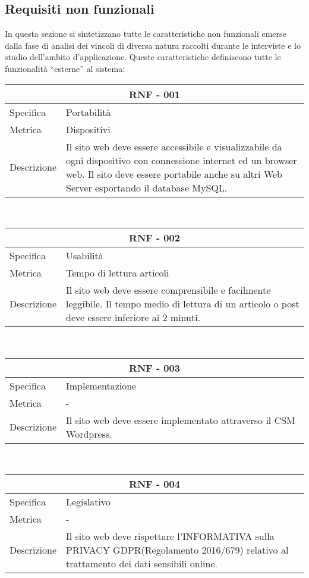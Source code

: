 \documentclass{article}
\begin{document}
\subsection{\textbf{Requisiti non funzionali}}
In questa sezione si sintetizzano tutte le caratteristiche non funzionali emerse dalla fase di  analisi dei vincoli di diversa natura raccolti durante le interviste e lo studio dell'ambito d'applicazione. Queste caratteristiche definiscono tutte le funzionalità “esterne” al sistema:
\vspace{4mm} \vspace{4mm} 
\begin{tabular}{ |p{3cm}|p{8cm}|  }
	\hline
	\multicolumn{2}{|c|}{\textbf{RNF - 001}} \\
	\hline
	Specifica&Portabilità\\
	\hline
	Metrica & Dispositivi\\
	\hline
	Descrizione&Il sito web deve essere accessibile e visualizzabile da ogni dispositivo con connessione internet ed un browser web. Il sito deve essere portabile anche su altri Web Server esportando il database MySQL.\\
	\hline
\end{tabular}\\
\vspace{4mm} 
\begin{tabular}{ |p{3cm}|p{8cm}|  }
	\hline
	\multicolumn{2}{|c|}{\textbf{RNF - 002}} \\
	\hline
	Specifica&Usabilità \\
	\hline
	Metrica & Tempo di lettura articoli\\
	\hline
	Descrizione&Il sito web deve essere comprensibile e facilmente leggibile. Il tempo medio di lettura di un articolo o post deve essere inferiore ai 2 minuti.\\
	\hline
\end{tabular}\\
\clearpage
\begin{tabular}{ |p{3cm}|p{8cm}|  }
	\hline
	\multicolumn{2}{|c|}{\textbf{RNF - 003}} \\
	\hline
	Specifica &Implementazione\\
	\hline
	Metrica &  -\\
	\hline
	Descrizione&Il sito web deve essere implementato attraverso il CSM Wordpress.\\
	\hline
\end{tabular}\\
\vspace{4mm} 
\begin{tabular}{ |p{3cm}|p{8cm}|  }
	\hline
	\multicolumn{2}{|c|}{\textbf{RNF - 004}} \\
	\hline
	Specifica&Legislativo\\
	\hline
	Metrica &  -\\
	\hline
	Descrizione&Il sito web deve rispettare l'INFORMATIVA sulla PRIVACY GDPR(Regolamento 2016/679) relativo al trattamento dei dati sensibili online.\\
	\hline
\end{tabular}\\
\end{document}
